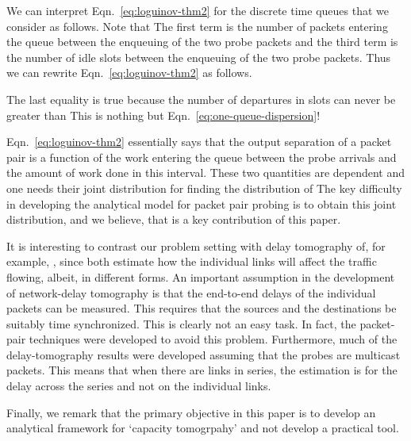 \documentclass[11pt]{article}
\begin{document}
We can interpret Eqn.~\ref{eq:loguinov-thm2} for the discrete time
queues that we consider as follows. Note that  The first term
is the number of packets entering the queue between the enqueuing of
the two probe packets and the third term is the number of idle slots
between the enqueuing of the two probe packets. Thus we can rewrite
Eqn.~\ref{eq:loguinov-thm2} as follows.

The last equality is true because the number of departures in 
slots can never be greater than  This is nothing but
Eqn.~\ref{eq:one-queue-dispersion}!

Eqn.~\ref{eq:loguinov-thm2} essentially says that the output
separation of a packet pair is a function of the work entering the
queue between the probe arrivals and the amount of work done in this
interval. These two quantities are dependent and one needs their joint
distribution for finding the distribution of  The
key difficulty in developing the analytical model for packet pair
probing is to obtain this joint distribution, and we believe, that is
a key contribution of this paper.

It is interesting to contrast our problem setting with delay
tomography of, for example, \cite{Coates01,Tsang01}, since both
estimate how the individual links will affect the traffic flowing,
albeit, in different forms.  An important assumption in the
development of network-delay tomography is that the end-to-end delays
of the individual packets can be measured. This requires that the
sources and the destinations be suitably time synchronized. This is
clearly not an easy task. In fact, the packet-pair techniques were
developed to avoid this problem.  Furthermore, much of the
delay-tomography results were developed assuming that the probes are
multicast packets.  This means that when there are links in series,
the estimation is for the delay across the series and not on the
individual links.

Finally, we remark that the primary objective in this paper is to
develop an analytical framework for `capacity tomogrpahy' and not
develop a practical tool. 
\end{document}
